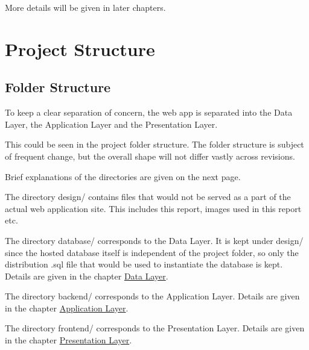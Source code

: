 \documentclass[12pt]{report}
\begin{document}
More details will be given in later chapters.

\newpage
\section{Project Structure} \label{overview.project-structure}

\subsection{Folder Structure} \label{overview.project-structure.folder-structure}

To keep a clear separation of concern, the web app is separated into
the Data Layer, the Application Layer and the Presentation Layer.
\vspace{1 em}

This could be seen in the project folder structure.
The folder structure is subject of frequent change, but the overall shape will not differ vastly across revisions.
\vspace{1 em}

\setlength{\DTbaselineskip}{25pt}
\renewcommand{\DTstyle}{\rmfamily\large}
\vspace{3 em}

Brief explanations of the directories are given on the next page.

\newpage

The directory design/ contains files that would not be served as a part of the actual web application site.
This includes this report, images used in this report etc.
\vspace{1 em}

The directory database/ corresponds to the Data Layer. It is kept under design/ since the hosted database itself is independent of the project folder, so only the distribution .sql file that would be used to instantiate the database is kept.
Details are given in the chapter \hyperref[data-layer]{Data Layer}.
\vspace{1 em}

The directory backend/ corresponds to the Application Layer.
Details are given in the chapter \hyperref[application-layer]{Application Layer}.
\vspace{1 em}

The directory frontend/ corresponds to the Presentation Layer.
Details are given in the chapter \hyperref[presentation-layer]{Presentation Layer}.
\vspace{1 em}
\end{document}
